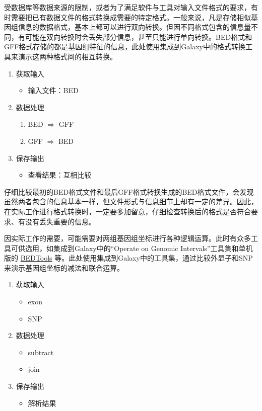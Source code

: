 受数据库等数据来源的限制，或者为了满足软件与工具对输入文件格式的要求，有时需要把已有数据文件的格式转换成需要的特定格式。一般来说，凡是存储相似基因组信息的数据格式，基本上都可以进行双向转换。但因不同格式包含的信息量不同，有可能在双向转换时会丢失部分信息，甚至只能进行单向转换。BED格式和GFF格式存储的都是基因组特征的信息，此处使用集成到Galaxy中的格式转换工具来演示这两种格式间的相互转换。
\begin{enumerate}
		\item 获取输入
			\begin{itemize}
				\item 输入文件：BED
			\end{itemize}
		\item 数据处理
			\begin{enumerate}
				\item BED $\Rightarrow$ GFF
				\item GFF $\Rightarrow$ BED
			\end{enumerate}
		\item 保存输出
			\begin{itemize}
				\item 查看结果：互相比较
			\end{itemize}
\end{enumerate}

仔细比较最初的BED格式文件和最后GFF格式转换生成的BED格式文件，会发现虽然两者包含的信息基本一样，但文件形式与信息细节上却有一定的差异。因此，在实际工作进行格式转换时，一定要多加留意，仔细检查转换后的格式是否符合要求、有没有丢失重要的信息。

因实际工作的需要，可能需要对两组基因组坐标进行各种逻辑运算。此时有众多工具可供选用，如集成到Galaxy中的“Operate on Genomic Intervals”工具集和单机版的 \href{http://bedtools.readthedocs.org/en/latest}{BEDTools} 等。此处使用集成到Galaxy中的工具集，通过比较外显子和SNP来演示基因组坐标的减法和联合运算。
\begin{enumerate}
		\item 获取输入
			\begin{itemize}
				\item exon
				\item SNP
			\end{itemize}
		\item 数据处理
			\begin{itemize}
				\item subtract
				\item join
			\end{itemize}
		\item 保存输出
			\begin{itemize}
				\item 解析结果
			\end{itemize}
\end{enumerate}


